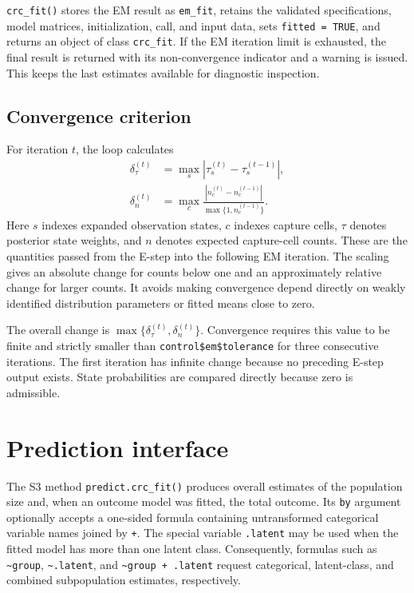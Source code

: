 \documentclass[11pt,letterpaper]{article}
\begin{document}
\texttt{crc\_fit()} stores the EM result as \texttt{em\_fit}, retains the
validated specifications, model matrices, initialization, call, and input
data, sets \texttt{fitted = TRUE}, and returns an object of class
\texttt{crc\_fit}. If the EM iteration limit is exhausted, the final result is
returned with its non-convergence indicator and a warning is issued. This
keeps the last estimates available for diagnostic inspection.

\subsection{Convergence criterion}

For iteration $t$, the loop calculates
\begin{align*}
  \delta_\tau^{(t)}
    &= \max_s |\tau_s^{(t)}-\tau_s^{(t-1)}|,\\
  \delta_n^{(t)}
    &= \max_c
      \frac{|n_c^{(t)}-n_c^{(t-1)}|}
           {\max\{1,n_c^{(t-1)}\}}.
\end{align*}
Here $s$ indexes expanded observation states, $c$ indexes capture cells,
$\tau$ denotes posterior state weights, and $n$ denotes expected capture-cell
counts. These are the quantities passed from the E-step into the following EM
iteration. The scaling gives an absolute change for counts below one and an
approximately relative change for larger counts. It avoids making convergence
depend directly on weakly identified distribution parameters or fitted means
close to zero.

The overall change is $\max\{\delta_\tau^{(t)},\delta_n^{(t)}\}$. Convergence
requires this value to be finite and strictly smaller than
\texttt{control\$em\$tolerance} for three consecutive iterations. The first
iteration has infinite change because no preceding E-step output exists. State
probabilities are compared directly because zero is admissible.

\section{Prediction interface}

The S3 method \texttt{predict.crc\_fit()} produces overall estimates of the
population size and, when an outcome model was fitted, the total outcome. Its
\texttt{by} argument optionally accepts a one-sided formula containing
untransformed categorical variable names joined by \texttt{+}. The special
variable \texttt{.latent} may be used when the fitted model has more than one
latent class. Consequently, formulas such as \texttt{\textasciitilde group},
\texttt{\textasciitilde .latent}, and
\texttt{\textasciitilde group + .latent} request categorical, latent-class,
and combined subpopulation estimates, respectively.
\end{document}
